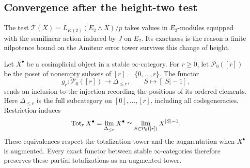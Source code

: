 \subsection{Convergence after the height-two test}

The test \(\mathcal T(X)=L_{K(2)}(E_2\wedge X)/p\) takes values in
\(E_2\)-modules equipped with the semilinear action induced by \(J\) on
\(E_2\). Its exactness is the reason a finite nilpotence bound on the
Amitsur error tower survives this change of height.

\begin{lemma}\label{lem:finite-totalizations}
Let $X^\bullet$ be a cosimplicial object in a stable $\infty$-category.
For $r\geq0$, let $\mathcal P_0([r])$ be the poset of nonempty subsets of
$[r]=\{0,\ldots,r\}$.  The functor
\[
 g_r:\mathcal P_0([r])\longrightarrow\Delta_{\leq r},\qquad
 S\longmapsto[|S|-1],
\]
sends an inclusion to the injection recording the positions of its ordered
elements.  Here $\Delta_{\leq r}$ is the full subcategory on
$[0],\ldots,[r]$, including all codegeneracies.  Restriction induces
\begin{equation}\label{eq:finite-totalization-cube}
 \operatorname{Tot}_r X^\bullet=\lim_{\Delta_{\leq r}}X^\bullet
 \simeq\lim_{S\in\mathcal P_0([r])}X^{|S|-1}.
\end{equation}
These equivalences respect the totalization tower and the augmentation
when $X^\bullet$ is augmented.  Every exact functor between stable
$\infty$-categories therefore preserves these partial totalizations as
an augmented tower.
\end{lemma}

